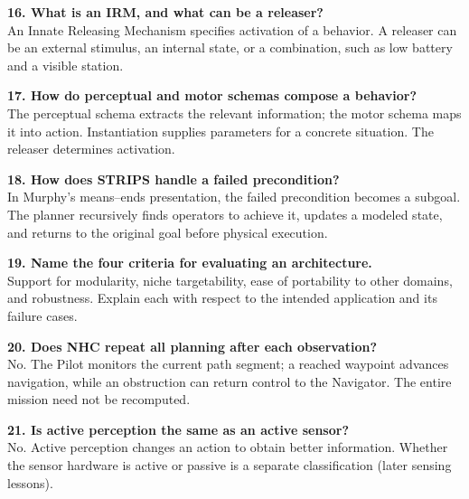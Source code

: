 \begin{samepage}\textbf{16. What is an IRM, and what can be a releaser?}\\
An Innate Releasing Mechanism specifies activation of a behavior. A releaser can be an external stimulus, an internal state, or a combination, such as low battery and a visible station.\par\end{samepage}

\begin{samepage}\textbf{17. How do perceptual and motor schemas compose a behavior?}\\
The perceptual schema extracts the relevant information; the motor schema maps it into action. Instantiation supplies parameters for a concrete situation. The releaser determines activation.\par\end{samepage}

\begin{samepage}\textbf{18. How does STRIPS handle a failed precondition?}\\
In Murphy's means--ends presentation, the failed precondition becomes a subgoal. The planner recursively finds operators to achieve it, updates a modeled state, and returns to the original goal before physical execution.\par\end{samepage}

\begin{samepage}\textbf{19. Name the four criteria for evaluating an architecture.}\\
Support for modularity, niche targetability, ease of portability to other domains, and robustness. Explain each with respect to the intended application and its failure cases.\par\end{samepage}

\begin{samepage}\textbf{20. Does NHC repeat all planning after each observation?}\\
No. The Pilot monitors the current path segment; a reached waypoint advances navigation, while an obstruction can return control to the Navigator. The entire mission need not be recomputed.\par\end{samepage}

\begin{samepage}\textbf{21. Is active perception the same as an active sensor?}\\
No. Active perception changes an action to obtain better information. Whether the sensor hardware is active or passive is a separate classification (later sensing lessons).\par\end{samepage}

